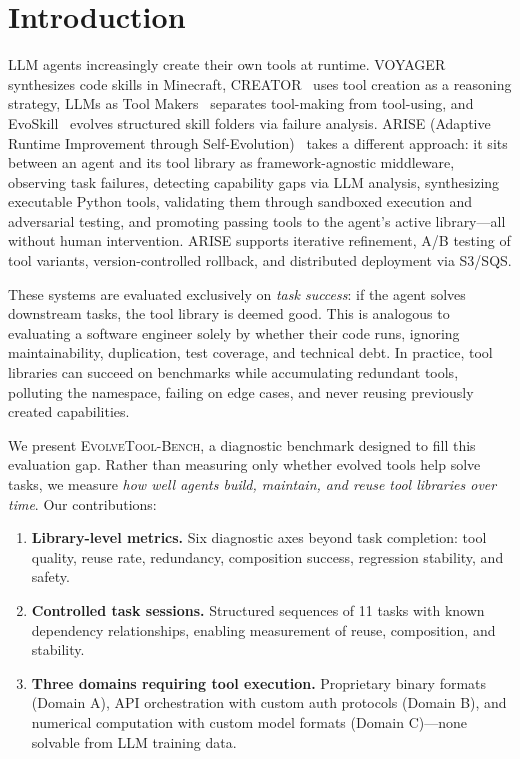 \documentclass[]{ceurart}
\begin{document}
\maketitle

\section{Introduction}

LLM agents increasingly create their own tools at runtime. VOYAGER~\cite{wang2023voyager} synthesizes code skills in Minecraft, CREATOR~\cite{qian2023creator} uses tool creation as a reasoning strategy, LLMs as Tool Makers~\cite{cai2023latm} separates tool-making from tool-using, and EvoSkill~\cite{alzubi2026evoskill} evolves structured skill folders via failure analysis. ARISE (Adaptive Runtime Improvement through Self-Evolution)~\cite{kaliyev2026arise} takes a different approach: it sits between an agent and its tool library as framework-agnostic middleware, observing task failures, detecting capability gaps via LLM analysis, synthesizing executable Python tools, validating them through sandboxed execution and adversarial testing, and promoting passing tools to the agent's active library---all without human intervention. ARISE supports iterative refinement, A/B testing of tool variants, version-controlled rollback, and distributed deployment via S3/SQS.

These systems are evaluated exclusively on \emph{task success}: if the agent solves downstream tasks, the tool library is deemed good. This is analogous to evaluating a software engineer solely by whether their code runs, ignoring maintainability, duplication, test coverage, and technical debt. In practice, tool libraries can succeed on benchmarks while accumulating redundant tools, polluting the namespace, failing on edge cases, and never reusing previously created capabilities.

We present \textsc{EvolveTool-Bench}, a diagnostic benchmark designed to fill this evaluation gap. Rather than measuring only whether evolved tools help solve tasks, we measure \emph{how well agents build, maintain, and reuse tool libraries over time}. Our contributions:

\begin{enumerate}
\item \textbf{Library-level metrics.} Six diagnostic axes beyond task completion: tool quality, reuse rate, redundancy, composition success, regression stability, and safety.

\item \textbf{Controlled task sessions.} Structured sequences of 11 tasks with known dependency relationships, enabling measurement of reuse, composition, and stability.

\item \textbf{Three domains requiring tool execution.} Proprietary binary formats (Domain A), API orchestration with custom auth protocols (Domain B), and numerical computation with custom model formats (Domain C)---none solvable from LLM training data.
\end{enumerate}
\end{document}
